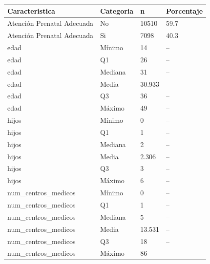 \begin{tabular}{llll}
  \toprule
Caracteristica & Categoria & n & Porcentaje \\ 
  \midrule
Atención Prenatal Adecuada & No & 10510 & 59.7 \\ 
  Atención Prenatal Adecuada & Si & 7098 & 40.3 \\ 
  edad & Mínimo & 14 & -- \\ 
  edad & Q1 & 26 & -- \\ 
  edad & Mediana & 31 & -- \\ 
  edad & Media & 30.933 & -- \\ 
  edad & Q3 & 36 & -- \\ 
  edad & Máximo & 49 & -- \\ 
  hijos & Mínimo & 0 & -- \\ 
  hijos & Q1 & 1 & -- \\ 
  hijos & Mediana & 2 & -- \\ 
  hijos & Media & 2.306 & -- \\ 
  hijos & Q3 & 3 & -- \\ 
  hijos & Máximo & 6 & -- \\ 
  num\_centros\_medicos & Mínimo & 0 & -- \\ 
  num\_centros\_medicos & Q1 & 1 & -- \\ 
  num\_centros\_medicos & Mediana & 5 & -- \\ 
  num\_centros\_medicos & Media & 13.531 & -- \\ 
  num\_centros\_medicos & Q3 & 18 & -- \\ 
  num\_centros\_medicos & Máximo & 86 & -- \\ 
   \bottomrule
\end{tabular}
